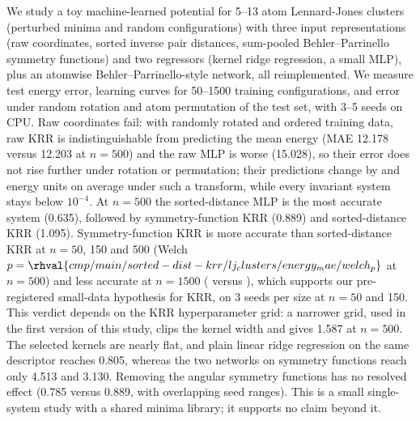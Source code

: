 We study a toy machine-learned potential for 5--13 atom Lennard-Jones clusters (perturbed minima and random configurations) with three input representations (raw coordinates, sorted inverse pair distances, sum-pooled Behler--Parrinello symmetry functions) and two regressors (kernel ridge regression, a small MLP), plus an atomwise Behler--Parrinello-style network, all reimplemented. We measure test energy error, learning curves for 50--1500 training configurations, and error under random rotation and atom permutation of the test set, with 3--5 seeds on CPU. Raw coordinates fail: with randomly rotated and ordered training data, raw KRR is indistinguishable from predicting the mean energy (MAE 12.178 versus 12.203 at $n{=}500$) and the raw MLP is worse (15.028), so their error does not rise further under rotation or permutation; their predictions change by  and  energy units on average under such a transform, while every invariant system stays below $10^{-4}$. At $n{=}500$ the sorted-distance MLP is the most accurate system (0.635), followed by symmetry-function KRR (0.889) and sorted-distance KRR (1.095). Symmetry-function KRR is more accurate than sorted-distance KRR at $n{=}50$, 150 and 500 (Welch $p=\rhval{cmp/main/sorted-dist-krr/lj_clusters/energy_mae/welch_p}$ at $n{=}500$) and less accurate at $n{=}1500$ ( versus ), which supports our pre-registered small-data hypothesis for KRR, on 3 seeds per size at $n{=}50$ and 150. This verdict depends on the KRR hyperparameter grid: a narrower grid, used in the first version of this study, clips the kernel width and gives 1.587 at $n{=}500$. The selected kernels are nearly flat, and plain linear ridge regression on the same descriptor reaches 0.805, whereas the two networks on symmetry functions reach only 4.513 and 3.130. Removing the angular symmetry functions has no resolved effect (0.785 versus 0.889, with overlapping seed ranges). This is a small single-system study with a shared minima library; it supports no claim beyond it.
